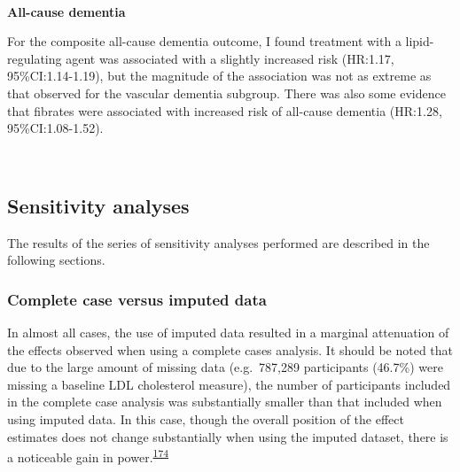 \documentclass[a4paper, twoside]{templates/ociamthesis}
\begin{document}
~

\textbf{All-cause dementia}

For the composite all-cause dementia outcome, I found treatment with a lipid-regulating agent was associated with a slightly increased risk (HR:1.17, 95\%CI:1.14-1.19), but the magnitude of the association was not as extreme as that observed for the vascular dementia subgroup. There was also some evidence that fibrates were associated with increased risk of all-cause dementia (HR:1.28, 95\%CI:1.08-1.52).

~

\hypertarget{sensitivity-analyses-2}{%
\subsection{Sensitivity analyses}\label{sensitivity-analyses-2}}

The results of the series of sensitivity analyses performed are described in the following sections.

\hypertarget{complete-case-versus-imputed-data}{%
\subsubsection{Complete case versus imputed data}\label{complete-case-versus-imputed-data}}

In almost all cases, the use of imputed data resulted in a marginal attenuation of the effects observed when using a complete cases analysis. It should be noted that due to the large amount of missing data (e.g.~787,289 participants (46.7\%) were missing a baseline LDL cholesterol measure), the number of participants included in the complete case analysis was substantially smaller than that included when using imputed data. In this case, though the overall position of the effect estimates does not change substantially when using the imputed dataset, there is a noticeable gain in power.\textsuperscript{\protect\hyperlink{ref-sterne2009}{174}}

~
\end{document}
